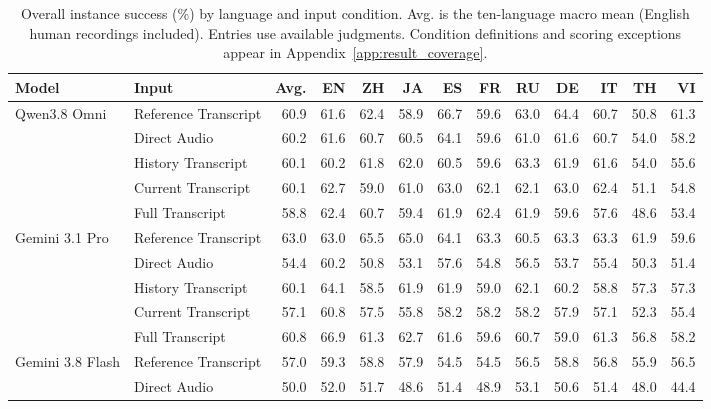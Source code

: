 \begin{table}[htbp]
\centering
\caption{Overall instance success (\%) by language and input condition. Avg. is the ten-language macro mean (English human recordings included). Entries use available judgments. Condition definitions and scoring exceptions appear in Appendix~\ref{app:result_coverage}.}
\label{tab:instance_conditions}
\begingroup
\fontsize{8.2}{9.1}\selectfont
\setlength{\tabcolsep}{1pt}
\renewcommand{\arraystretch}{1.06}
\begin{tabular*}{\linewidth}{@{}ll@{\extracolsep{\fill}}*{11}{r}@{}}
\toprule
\textbf{Model} & \textbf{Input} & \textbf{Avg.} & \textbf{EN} & \textbf{ZH} & \textbf{JA} & \textbf{ES} & \textbf{FR} & \textbf{RU} & \textbf{DE} & \textbf{IT} & \textbf{TH} & \textbf{VI} \\
\midrule
Qwen3.8 Omni & Reference Transcript & 60.9 & 61.6 & 62.4 & 58.9 & 66.7 & 59.6 & 63.0 & 64.4 & 60.7 & 50.8 & 61.3 \\
 & Direct Audio & 60.2 & 61.6 & 60.7 & 60.5 & 64.1 & 59.6 & 61.0 & 61.6 & 60.7 & 54.0 & 58.2 \\
 & History Transcript & 60.1 & 60.2 & 61.8 & 62.0 & 60.5 & 59.6 & 63.3 & 61.9 & 61.6 & 54.0 & 55.6 \\
 & Current Transcript & 60.1 & 62.7 & 59.0 & 61.0 & 63.0 & 62.1 & 62.1 & 63.0 & 62.4 & 51.1 & 54.8 \\
 & Full Transcript & 58.8 & 62.4 & 60.7 & 59.4 & 61.9 & 62.4 & 61.9 & 59.6 & 57.6 & 48.6 & 53.4 \\
\addlinespace[1pt]
\midrule
Gemini 3.1 Pro & Reference Transcript & 63.0 & 63.0 & 65.5 & 65.0 & 64.1 & 63.3 & 60.5 & 63.3 & 63.3 & 61.9 & 59.6 \\
 & Direct Audio & 54.4 & 60.2 & 50.8 & 53.1 & 57.6 & 54.8 & 56.5 & 53.7 & 55.4 & 50.3 & 51.4 \\
 & History Transcript & 60.1 & 64.1 & 58.5 & 61.9 & 61.9 & 59.0 & 62.1 & 60.2 & 58.8 & 57.3 & 57.3 \\
 & Current Transcript & 57.1 & 60.8 & 57.5 & 55.8 & 58.2 & 58.2 & 58.2 & 57.9 & 57.1 & 52.3 & 55.4 \\
 & Full Transcript & 60.8 & 66.9 & 61.3 & 62.7 & 61.6 & 59.6 & 60.7 & 59.0 & 61.3 & 56.8 & 58.2 \\
\addlinespace[1pt]
\midrule
Gemini 3.8 Flash & Reference Transcript & 57.0 & 59.3 & 58.8 & 57.9 & 54.5 & 54.5 & 56.5 & 58.8 & 56.8 & 55.9 & 56.5 \\
 & Direct Audio & 50.0 & 52.0 & 51.7 & 48.6 & 51.4 & 48.9 & 53.1 & 50.6 & 51.4 & 48.0 & 44.4 \\

\end{tabular*}
\end{table}
